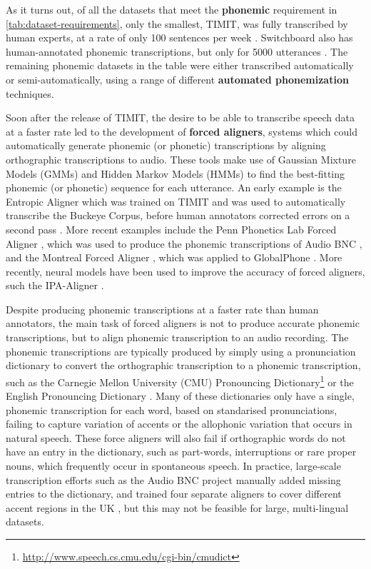 As it turns out, of all the datasets that meet the \textbf{phonemic} requirement in \cref{tab:dataset-requirements}, only the smallest, TIMIT, was fully transcribed by human experts, at a rate of only 100 sentences per week \citep{zue1996transcription, lamel1989speech}. Switchboard also has human-annotated phonemic transcriptions, but only for 5000 utterances \citep{greenberg1996insights}. The remaining phonemic datasets in the table were either transcribed automatically or semi-automatically, using a range of different \textbf{automated phonemization} techniques.

Soon after the release of TIMIT, the desire to be able to transcribe speech data at a faster rate led to the development of \textbf{forced aligners}, systems which could automatically generate phonemic (or phonetic) transcriptions by aligning orthographic transcriptions to audio. These tools make use of Gaussian Mixture Models (GMMs) and Hidden Markov Models (HMMs) to find the best-fitting phonemic (or phonetic) sequence for each utterance. An early example is the Entropic Aligner \citep{wightman1997aligner} which was trained on TIMIT and was used to automatically transcribe the Buckeye Corpus, before human annotators corrected errors on a second pass \citep{PITT200589}. More recent examples include the Penn Phonetics Lab Forced Aligner \citep{yuan2008speaker}, which was used to produce the phonemic transcriptions of Audio BNC \citep{coleman2011miningb}, and the Montreal Forced Aligner \citep{mcauliffe2017montreal}, which was applied to GlobalPhone \citep{schultz2013globalphone}. More recently, neural models have been used to improve the accuracy of forced aligners, such the IPA-Aligner \citep{zhu-etal-2024-taste}.

Despite producing phonemic transcriptions at a faster rate than human annotators, the main task of forced aligners is not to produce accurate phonemic transcriptions, but to align phonemic transcription to an audio recording. The phonemic transcriptions are typically produced by simply using a pronunciation dictionary to convert the orthographic transcription to a phonemic transcription, such as the Carnegie Mellon University (CMU) Pronouncing Dictionary\footnote{\url{http://www.speech.cs.cmu.edu/cgi-bin/cmudict}} or the English Pronouncing Dictionary \citep{jones2011cambridge}. Many of these dictionaries only have a single, phonemic transcription for each word, based on standarised pronunciations, failing to capture variation of accents or the allophonic variation that occurs in natural speech. These force aligners will also fail if orthographic words do not have an entry in the dictionary, such as part-words, interruptions or rare proper nouns, which frequently occur in spontaneous speech. In practice, large-scale transcription efforts such as the Audio BNC project manually added missing entries to the dictionary, and trained four separate aligners to cover different accent regions in the UK \citep{coleman2011miningb}, but this may not be feasible for large, multi-lingual datasets. 

